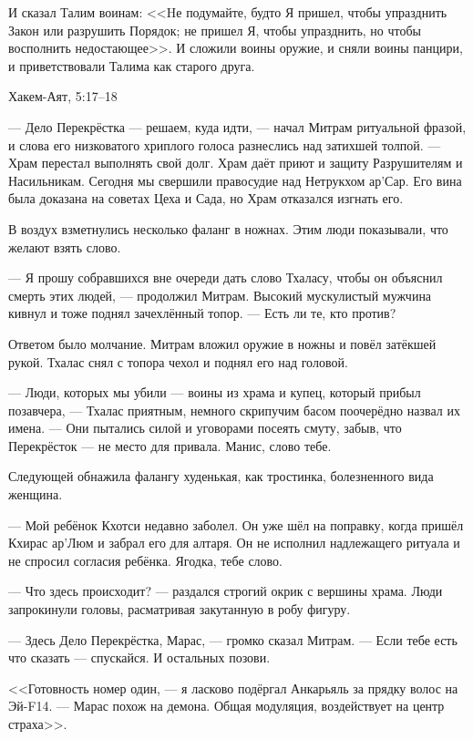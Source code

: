 \epigraph
{И сказал Талим воинам: <<Hе подумайте, будто Я пришел, чтобы упразднить Закон или разрушить Порядок;
не пришел Я, чтобы упразднить, но чтобы восполнить недостающее>>.
И сложили воины оружие, и сняли воины панцири, и приветствовали Талима как старого друга.}
{Хакем-Аят, 5:17--18}

--- Дело Перекрёстка --- решаем, куда идти, --- начал Митрам ритуальной фразой, и слова его низковатого хриплого голоса разнеслись над затихшей толпой.
--- Храм перестал выполнять свой долг.
Храм даёт приют и защиту Разрушителям и Насильникам.
Сегодня мы свершили правосудие над Нетрукхом ар’Сар.
Его вина была доказана на советах Цеха и Сада, но Храм отказался изгнать его.

В воздух взметнулись несколько фаланг в ножнах.
Этим люди показывали, что желают взять слово.

--- Я прошу собравшихся вне очереди дать слово Тхаласу, чтобы он объяснил смерть этих людей, --- продолжил Митрам.
Высокий мускулистый мужчина кивнул и тоже поднял зачехлённый топор.
--- Есть ли те, кто против?

Ответом было молчание.
Митрам вложил оружие в ножны и повёл затёкшей рукой.
Тхалас снял с топора чехол и поднял его над головой.

--- Люди, которых мы убили --- воины из храма и купец, который прибыл позавчера, --- Тхалас приятным, немного скрипучим басом поочерёдно назвал их имена.
--- Они пытались силой и уговорами посеять смуту, забыв, что Перекрёсток --- не место для привала.
Манис, слово тебе.

Следующей обнажила фалангу худенькая, как тростинка, болезненного вида женщина.

--- Мой ребёнок Кхотси недавно заболел.
Он уже шёл на поправку, когда пришёл Кхирас ар’Люм и забрал его для алтаря.
Он не исполнил надлежащего ритуала и не спросил согласия ребёнка.
Ягодка, тебе слово.

--- Что здесь происходит? --- раздался строгий окрик с вершины храма.
Люди запрокинули головы, расматривая закутанную в робу фигуру.

--- Здесь Дело Перекрёстка, Марас, --- громко сказал Митрам.
--- Если тебе есть что сказать --- спускайся.
И остальных позови.

<<Готовность номер один, --- я ласково подёргал Анкарьяль за прядку волос на Эй-F14.
--- Марас похож на демона.
Общая модуляция\FM, воздействует на центр страха>>.

